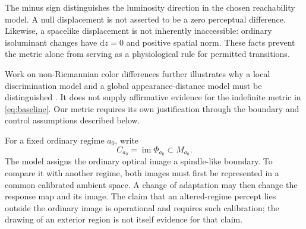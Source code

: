 \documentclass[9pt,twocolumn,twoside]{opticajnl}
\theoremstyle{plain}
\newcommand{\dd}{\mathrm{d}}
\begin{document}
The minus sign distinguishes the luminosity direction in the chosen reachability model. A null displacement is not asserted to be a zero perceptual difference. Likewise, a spacelike displacement is not inherently inaccessible: ordinary isoluminant changes have $\dd z=0$ and positive spatial norm. These facts prevent the metric alone from serving as a physiological rule for permitted transitions.

Work on non-Riemannian color differences further illustrates why a local discrimination model and a global appearance-distance model must be distinguished \cite{Bujack2022}. It does not supply affirmative evidence for the indefinite metric in \eqref{eq:baseline}. Our metric requires its own justification through the boundary and control assumptions described below.

For a fixed ordinary regime $a_0$, write
\begin{equation}
 C_{a_0}=\operatorname{im}\Phi_{a_0}\subset M_{a_0}.
 \label{eq:image}
\end{equation}
The model assigns the ordinary optical image a spindle-like boundary. To compare it with another regime, both images must first be represented in a common calibrated ambient space. A change of adaptation may then change the response map and its image. The claim that an altered-regime percept lies outside the ordinary image is operational and requires such calibration; the drawing of an exterior region is not itself evidence for that claim.
\end{document}
